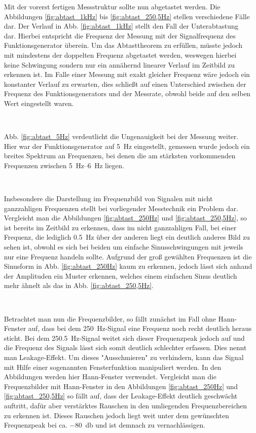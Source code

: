 		Mit der vorerst fertigen Messstruktur sollte nun abgetastet werden.
		Die Abbildungen \ref{fig:abtast_1kHz} bis \ref{fig:abtast_250,5Hz} stellen verschiedene Fälle dar.
		Der Verlauf in Abb. \ref{fig:abtast_1kHz} stellt den Fall der Unterabtastung dar.
		Hierbei entspricht die Frequenz der Messung mit der Signalfrequenz des Funktionsgenerator überein.
		Um das Abtasttheorem zu erfüllen, müsste jedoch mit mindestens der doppelten Frequenz abgetastet werden, weswegen hierbei keine Schwingung sondern nur ein annähernd linearer Verlauf im Zeitbild zu erkennen ist.
		Im Falle einer Messung mit exakt gleicher Frequenz wäre jedoch ein konstanter Verlauf zu erwarten, dies schließt auf einen Unterschied zwischen der Frequenz des Funktionsgenerators und der Messrate, obwohl beide auf den selben Wert eingestellt waren.
			
		\
		
		Abb. \ref{fig:abtast_5Hz} verdeutlicht die Ungenauigkeit bei der Messung weiter.
		Hier war der Funktionsgenerator auf \SI{5}{\hertz} eingestellt, gemessen wurde jedoch ein breites Spektrum an Frequenzen, bei denen die am stärksten vorkommenden Frequenzen zwischen \SIrange{5}{6}{\hertz} liegen.
			
		\
		
		Insbesondere die Darstellung im Frequenzbild von Signalen mit nicht ganzzahligen Frequenzen stellt bei vorliegender Messtechnik ein Problem dar.
		Vergleicht man die Abbildungen \ref{fig:abtast_250Hz} und \ref{fig:abtast_250,5Hz}, so ist bereits im Zeitbild zu erkennen, dass im nicht ganzzahligen Fall, bei einer Frequenz, die lediglich \SI{0,5}{\hertz} über der anderen liegt ein deutlich anderes Bild zu sehen ist, obwohl es sich bei beiden um einfache Sinusschwingungen mit jeweils nur eine Frequenz handeln sollte.
		Aufgrund der groß gewählten Frequenzen ist die Sinusform in Abb. \ref{fig:abtast_250Hz} kaum zu erkennen, jedoch lässt sich anhand der Amplituden ein Muster erkennen, welches einem einfachen Sinus deutlich mehr ähnelt als das in Abb. \ref{fig:abtast_250,5Hz}.
			
		\
		
		Betrachtet man nun die Frequenzbilder, so fällt zunächst im Fall ohne Hann-Fenster auf, dass bei dem \SI{250}{\hertz}-Signal eine Frequenz noch recht deutlich heraus sticht.
		Bei dem \SI{250,5}{\hertz}-Signal weitet sich dieser Frequenzpeak jedoch auf und die Frequenz des Signals lässt sich somit deutlich schlechter erfassen.
		Dies nennt man Leakage-Effekt.
		Um dieses "Ausschmieren" zu verhindern, kann das Signal mit Hilfe einer sogenannten Fensterfunktion manipuliert werden.
		In den Abbildungen werden hier Hann-Fenster verwendet.
		Vergleicht man die Frequenzbilder mit Hann-Fenster in den Abbildungen \ref{fig:abtast_250Hz} und \ref{fig:abtast_250,5Hz} so fällt auf, dass der Leakage-Effekt deutlich geschwächt auftritt, dafür aber verstärktes Rauschen in den umliegenden Frequenzbereichen zu erkennen ist.
		Dieses Rauschen jedoch liegt weit unter dem gewünschten Frequenzpeak bei ca. \SI{-80}{\decibel} und ist demnach zu vernachlässigen.
		
